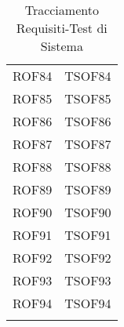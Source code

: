 \documentclass[../PianoDiQualifica_v3.0.0.tex]{subfiles}
\begin{document}
\begin{longtable}[c] { >{\centering\arraybackslash}p{3cm} >{\centering\arraybackslash}p{3cm}}
			\addlinespace[0.3em]
			\midrule
			\addlinespace[0.3em]
			ROF84 & TSOF84 \\
			\addlinespace[0.3em]
			\midrule
			\addlinespace[0.3em]
			ROF85 & TSOF85 \\
			\addlinespace[0.3em]
			\midrule
			\addlinespace[0.3em]
			ROF86 & TSOF86 \\
			\addlinespace[0.3em]
			\midrule
			\addlinespace[0.3em]
			ROF87 & TSOF87 \\
			\addlinespace[0.3em]
			\midrule
			\addlinespace[0.3em]
			ROF88 & TSOF88 \\
			\addlinespace[0.3em]
			\midrule
			\addlinespace[0.3em]
			ROF89 & TSOF89 \\
			\addlinespace[0.3em]
			\midrule
			\addlinespace[0.3em]
			ROF90 & TSOF90 \\
			\addlinespace[0.3em]
			\midrule
			\addlinespace[0.3em]
			ROF91 & TSOF91 \\
			\addlinespace[0.3em]
			\midrule
			\addlinespace[0.3em]
			ROF92 & TSOF92 \\
			\addlinespace[0.3em]
			\midrule
			\addlinespace[0.3em]
			ROF93 & TSOF93 \\
			\addlinespace[0.3em]
			\midrule
			\addlinespace[0.3em]
			ROF94 & TSOF94 \\
			\bottomrule
			\caption{Tracciamento Requisiti-Test di Sistema}
	\end{longtable}

	\newpage
\end{document}
